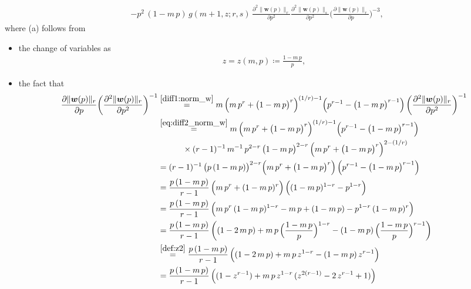\documentclass[conference, draftcls, onecolumn]{IEEEtran}
\theoremstyle{plain}
\newcommand{\bvec}[1]{\boldsymbol{#1}}
\newcommand{\lemref}[1]{Lemma~\ref{#1}}
\begin{document}
\begin{IEEEproof}[Proof of \lemref{lem:convex_w}]
\begin{align}
- p^{2} \, (1 - m \, p) \, g(m+1, z; r, s) \, \frac{ \partial^{2} \| \bvec{w}( p ) \|_{r} }{ \partial p^{2} } \frac{ \partial^{2} \| \bvec{w}( p ) \|_{s} }{ \partial p^{2} } \bigg( \frac{ \partial \| \bvec{w}( p ) \|_{r} }{ \partial p } \bigg)^{-3} ,
\label{eq:diff2_2norm_w}
\end{align}
where (a) follows from
\begin{itemize}
\item
the change of variables as
\begin{align}
z = z(m, p) \coloneqq \frac{ 1 - m \, p }{ p } ,
\label{def:z2}
\end{align}
\item
the fact that
\begin{align}
\frac{ \partial \| \bvec{w}( p ) \|_{r} }{ \partial p } \bigg( \frac{ \partial^{2} \| \bvec{w}( p ) \|_{r} }{ \partial p^{2} } \bigg)^{-1}
& \overset{\eqref{diff1:norm_w}}{=}
m \, \Big( m \, p^{r} + \big( 1 - m \, p \big)^{r} \Big)^{(1/r) - 1} \Big( p^{r-1} - \big( 1 - m \, p \big)^{r-1} \Big) \, \bigg( \frac{ \partial^{2} \| \bvec{w}( p ) \|_{r} }{ \partial p^{2} } \bigg)^{-1}
\\
& \overset{\eqref{eq:diff2_norm_w}}{=}
m \, \Big( m \, p^{r} + \big( 1 - m \, p \big)^{r} \Big)^{(1/r) - 1} \Big( p^{r-1} - \big( 1 - m \, p \big)^{r-1} \Big)
\notag \\
& \qquad \quad \times
(r-1)^{-1} \, m^{-1} \, p^{2-r} \, \big( 1 - m \, p \big)^{2-r} \, \Big( m \, p^{r} + \big( 1 - m \, p \big)^{r} \Big)^{2-(1/r)}
\\
& =
(r-1)^{-1} \, \big( p \, (1 - m \, p) \big)^{2-r} \Big( m \, p^{r} + \big( 1 - m \, p \big)^{r} \Big) \, \Big( p^{r-1} - \big( 1 - m \, p \big)^{r-1} \Big)
\\
& =
\frac{ p \, (1 - m \, p) }{ r - 1 } \, \Big( m \, p^{r} + ( 1 - m \, p )^{r} \Big) \, \Big( (1 - m \, p)^{1-r} - p^{1-r} \Big)
\\
& =
\frac{ p \, (1 - m \, p) }{ r - 1 } \, \Big( m \, p^{r} \, (1 - m \, p)^{1-r} - m \, p + (1 - m \, p) - p^{1-r} \, (1 - m \, p)^{r} \Big)
\\
& =
\frac{ p \, (1 - m \, p) }{ r - 1 } \, \bigg( (1 - 2 \, m \, p) + m \, p \, \Big( \frac{ 1 - m \, p }{ p } \Big)^{1-r} - (1 - m \, p) \, \Big( \frac{ 1 - m \, p }{ p } \Big)^{r-1} \bigg)
\\
& \overset{\eqref{def:z2}}{=}
\frac{ p \, (1 - m \, p) }{ r - 1 } \, \Big( (1 - 2 \, m \, p) + m \, p \, z^{1-r} - (1 - m \, p) \, z^{r-1} \Big)
\\
& =
\frac{ p \, (1 - m \, p) }{ r - 1 } \, \Big( (1 - z^{r-1}) + m \, p \, z^{1-r} \, (z^{2(r-1)} - 2 \, z^{r-1} + 1) \Big)

\end{align}
\end{itemize}
\end{IEEEproof}
\end{document}
